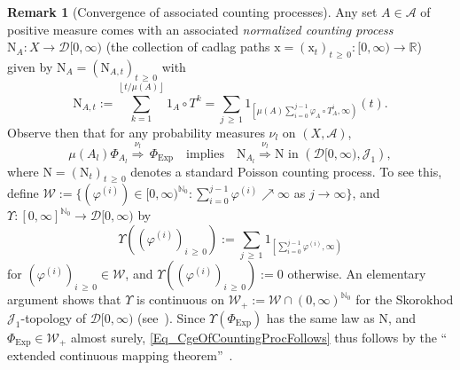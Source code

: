 \documentclass[10pt]{amsart}
\theoremstyle{definition}\newtheorem{defi}[theo]{Definition}\newtheorem{rema}[theo]{Remark}\newtheorem{exam}[theo]{Example}\newtheorem{exem}[theo]{Example}\newtheorem{nota}[theo]{Notation}
\newcommand{\clA}{\mathcal{A}}
\newcommand{\clD}{\mathcal{D}}
\newcommand{\clW}{\mathcal{W}}
\newcommand{\clJ}{\mathcal{J}}
\newcommand{\Expl}{\mathrm{Exp}}
\newcommand{\rmN}{\mathrm{N}}
\newcommand{\rmx}{\mathrm{x}}
\newcommand{\bbN}{\mathbb{N}}
\newcommand{\bbR}{\mathbb{R}}
\begin{document}
\begin{rema}[{Convergence of associated counting processes}]\label{R_CgeCounting1}
Any set $A\in\clA$ of positive measure comes with an associated
\emph{normalized counting process} $\rmN_{A}:X\rightarrow\clD [0,\infty)$ (the collection of cadlag paths $\rmx=(\rmx _{t})_{t\,\geq\,0}:[0,\infty)\rightarrow\bbR$) given by $\rmN _{A}=(\rmN_{A,t})_{t\,\geq\,0}$ with
\begin{equation}\label{Eq_DefNormalizedCountingProc}
\rmN_{A,t}:= {\sum_{k=1}^{\left\lfloor t/\mu(A)\right\rfloor }} 1_{A}\circ T^{k}= {\sum_{j\,\geq\,1}} 1_{\left[\mu(A)\sum\limits_{i=0}^{j-1}\varphi_{A}\circ T_{A}^{i},\infty\right) }(t).
\end{equation}
Observe then that for any probability measures $\nu_{l}$ on $(X,\clA) $,
\begin{equation}\label{Eq_CgeOfCountingProcFollows}
\mu(A_{l})\Phi_{A_{l}}\overset{\nu_{l}}{\Longrightarrow}\,\Phi_{\Expl }\quad\text{implies}\quad\rmN_{A_{l}}\overset{\nu_{l}} {\Longrightarrow}\rmN\text{ in }\left(\clD[0,\infty),\clJ_{1}\right), 
\end{equation}
where $\rmN=(\rmN_{t})_{t\,\geq\,0}$ denotes a standard Poisson counting process. To see this, define $\clW:=\{(\varphi^{(i)})\in\lbrack0,\infty)^{\bbN_{0}}:\sum_{i=0}^{j-1}\varphi^{(i)}
\nearrow\infty$ as $j\rightarrow\infty\}$, and $\Upsilon:[0,\infty]^{\bbN_{0}}\rightarrow\clD[0,\infty)$ by 
\[
\Upsilon \left(\left(\varphi^{(i)}\right)_{i\,\geq\,0}\right):=\sum_{j\,\geq\,1}1_{\left[\sum\limits_{i=0}^{j-1}
\varphi^{(i)},\infty\right) }
\]
for $(\varphi^{(i)})_{i\,\geq\,0}\in\clW$, and $\Upsilon((\varphi^{(i)})_{i\,\geq\,0}):=0$ otherwise. An elementary argument shows that $\Upsilon$ is continuous on $\clW_{+}:=\clW
\cap(0,\infty)^{\bbN_{0}}$ for the Skorokhod $\clJ_{1}$-topology of $\clD[0,\infty)$ (see~\cite{Bi,Whitt}). Since $\Upsilon (\Phi_{\Expl})$ has the same law as $\rmN$, and $\Phi _{\Expl}\in\clW_{+}$ almost surely, \eqref{Eq_CgeOfCountingProcFollows} thus follows by the `` extended continuous mapping theorem''~\cite[Theorem~2.7]{Bi}.
\end{rema}
\end{document}

